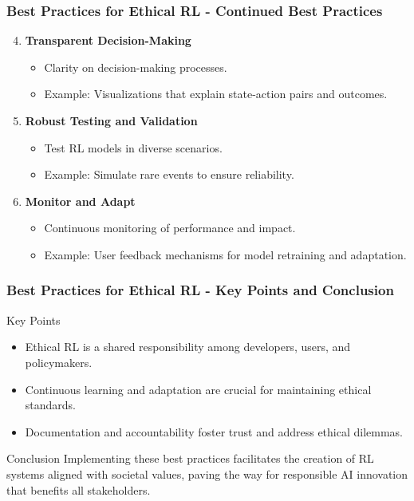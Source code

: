 \documentclass[aspectratio=169]{beamer}
\begin{document}
\begin{frame}[fragile]
    \frametitle{Best Practices for Ethical RL - Continued Best Practices}
    \begin{enumerate}
        \setcounter{enumi}{3} %
        \item \textbf{Transparent Decision-Making}
            \begin{itemize}
                \item Clarity on decision-making processes.
                \item Example: Visualizations that explain state-action pairs and outcomes.
            \end{itemize}
        
        \item \textbf{Robust Testing and Validation}
            \begin{itemize}
                \item Test RL models in diverse scenarios.
                \item Example: Simulate rare events to ensure reliability.
            \end{itemize}
        
        \item \textbf{Monitor and Adapt}
            \begin{itemize}
                \item Continuous monitoring of performance and impact.
                \item Example: User feedback mechanisms for model retraining and adaptation.
            \end{itemize}
    \end{enumerate}
\end{frame}

\begin{frame}[fragile]
    \frametitle{Best Practices for Ethical RL - Key Points and Conclusion}
    \begin{block}{Key Points}
        \begin{itemize}
            \item Ethical RL is a shared responsibility among developers, users, and policymakers.
            \item Continuous learning and adaptation are crucial for maintaining ethical standards.
            \item Documentation and accountability foster trust and address ethical dilemmas.
        \end{itemize}
    \end{block}
    
    \begin{block}{Conclusion}
        Implementing these best practices facilitates the creation of RL systems aligned with societal values, paving the way for responsible AI innovation that benefits all stakeholders.
    \end{block}
\end{frame}
\end{document}
